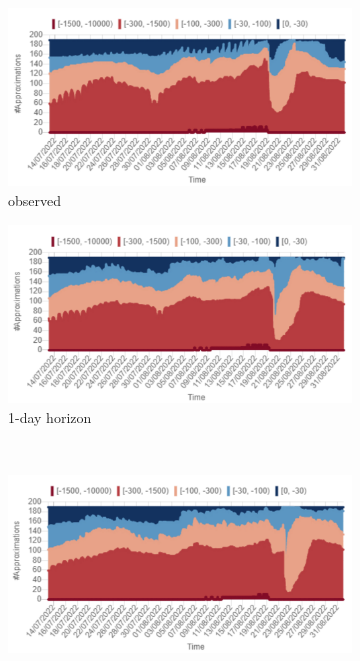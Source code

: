 \begin{figure}[t]
    \begin{subfigure}[b]{0.47\textwidth}
        \includegraphics[width=\textwidth]{chapters/physics-aware/orchard/img/obs_stacked.pdf}
        \caption{observed}
        \label{orchard-fig:stacked_a}
    \end{subfigure}
    \hfill
    \begin{subfigure}[b]{0.47\textwidth}
        \includegraphics[width=\textwidth]{chapters/physics-aware/orchard/img/1gg_stacked.pdf}
        \caption{1-day horizon}
        \label{orchard-fig:stacked_b}
    \end{subfigure}
    \\
    \begin{subfigure}[b]{0.47\textwidth}
        \includegraphics[width=\textwidth]{chapters/physics-aware/orchard/img/3gg_stacked.pdf}

\end{subfigure}
\end{figure}
